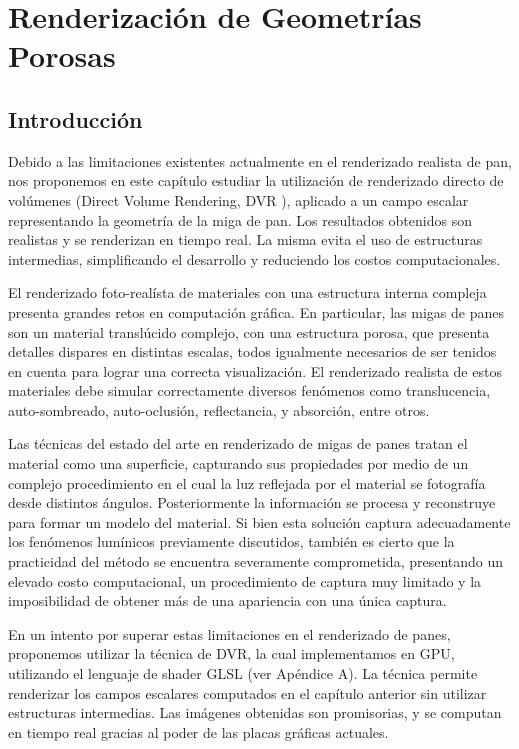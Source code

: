 
\chapter{Renderización de Geometrías Porosas}
\section{Introducción}
Debido a las limitaciones existentes actualmente en el renderizado realista de pan, nos proponemos en este capítulo estudiar la utilización de renderizado directo de volúmenes (Direct Volume Rendering, \acrshort{DVR} \cite{Kratz2006}), aplicado a un campo escalar representando la geometría de la miga de pan. 
Los resultados obtenidos son realistas y se renderizan en tiempo real. La misma evita el uso de estructuras intermedias, simplificando el desarrollo y reduciendo los costos computacionales.

El renderizado foto-realísta de materiales con una estructura interna compleja presenta grandes retos en computación gráfica.
En particular, las migas de panes son un material translúcido complejo, con una estructura porosa, que presenta detalles dispares en distintas escalas, todos igualmente necesarios de ser tenidos en cuenta para lograr una correcta visualización.
El renderizado realista de estos materiales debe simular correctamente diversos fenómenos como translucencia, auto-sombreado, auto-oclusión, reflectancia, y absorción, entre otros.

Las técnicas del estado del arte en renderizado de migas de panes tratan el material como una superficie, capturando sus propiedades por medio de un complejo procedimiento en el cual la luz reflejada por el material se fotografía desde distintos ángulos.
Posteriormente la información se procesa y reconstruye para formar un modelo del material.
Si bien esta solución captura adecuadamente los fenómenos lumínicos previamente discutidos, también es cierto que la practicidad del método se encuentra severamente comprometida, presentando un elevado costo computacional, un procedimiento de captura muy limitado y la imposibilidad de obtener más de una apariencia con una única captura.

En un intento por superar estas limitaciones en el renderizado de panes, proponemos utilizar la técnica de DVR, la cual implementamos en \acrshort{GPU}, utilizando el lenguaje de shader GLSL (ver Apéndice A).
La técnica permite renderizar los campos escalares computados en el capítulo anterior sin utilizar estructuras intermedias.
Las imágenes obtenidas son promisorias, y se computan en tiempo real gracias al poder de las placas gráficas actuales.

